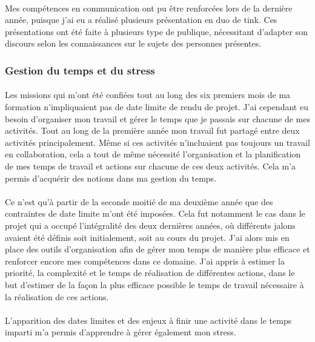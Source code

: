 \documentclass[12pt,a4paper]{report}
\begin{document}
\paragraph*{}Mes compétences en communication ont pu être renforcées lors de la dernière année, puisque j'ai eu a réalisé plusieurs présentation en duo de \gls{tink}. Ces présentations ont été faite à plusieurs type de publique, nécessitant d'adapter son discours selon les connaissances sur le sujets des personnes présentes. \\
\subsubsection{Gestion du temps et du stress}
\paragraph*{}Les missions qui m'ont été confiées tout au long des six premiers mois de ma formation n'impliquaient pas de date limite de rendu de projet. J'ai cependant eu besoin d'organiser mon travail et gérer le temps que je passais sur chacune de mes activités. Tout au long de la première année mon travail fut partagé entre deux activités principalement. Même si ces activités n'incluaient pas toujours un travail en collaboration, cela a tout de même nécessité l'organisation et la planification de mes temps de travail et actions sur chacune de ces deux activités. Cela m'a permis d'acquérir des notions dans ma gestion du temps.
\paragraph*{}Ce n'est qu'à partir de la seconde moitié de ma deuxième année que des contraintes de date limite m'ont été imposées. Cela fut notamment le cas dans le projet qui a occupé l'intégralité des deux dernières années, où différents jalons avaient été définis soit initialement, soit au cours du projet. J'ai alors mis en place des outils d’organisation afin de gérer mon temps de manière plus efficace et renforcer encore mes compétences dans ce domaine. J'ai appris à estimer la priorité, la complexité et le temps de réalisation de différentes actions, dans le but d’estimer de la façon la plus efficace possible le temps de travail nécessaire à la réalisation de ces actions.
\paragraph*{}L'apparition des dates limites et des enjeux à finir une activité dans le temps imparti m'a permis d'apprendre à gérer également mon stress. \\
\end{document}
